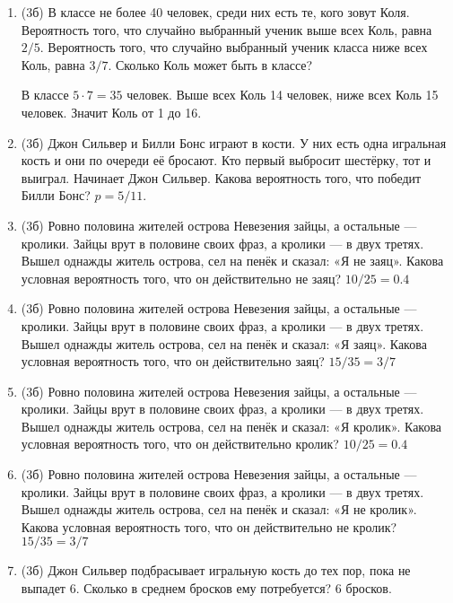 \documentclass[a4paper, 12pt]{article}
\begin{document}
\newpage
\begin{enumerate}[resume]
\item (3б) В классе не более 40 человек, среди них есть те, кого зовут Коля. Вероятность того, что случайно выбранный ученик выше всех Коль, равна $2/5$. Вероятность того, что случайно выбранный ученик класса ниже всех Коль, равна $3/7$. Сколько Коль может быть в классе?

В классе $5\cdot 7=35$ человек. Выше всех Коль 14 человек, ниже всех Коль 15 человек. Значит Коль от 1 до 16.
\item (3б) Джон Сильвер и Билли Бонс играют в кости. У них есть одна игральная кость и они по очереди её бросают. Кто первый выбросит шестёрку, тот и выиграл. Начинает Джон Сильвер. Какова вероятность того, что победит Билли Бонс? $p=5/11$.
\item (3б) Ровно половина жителей острова Невезения зайцы, а остальные — кролики. Зайцы врут в половине своих фраз, а кролики — в двух третях. Вышел однажды житель острова, сел на пенёк и сказал: «Я не заяц». Какова условная вероятность того, что он действительно не заяц? $10/25=0.4$
\item (3б) Ровно половина жителей острова Невезения зайцы, а остальные — кролики. Зайцы врут в половине своих фраз, а кролики — в двух третях. Вышел однажды житель острова, сел на пенёк и сказал: «Я заяц». Какова условная вероятность того, что он действительно заяц? $15/35=3/7$
\item (3б) Ровно половина жителей острова Невезения зайцы, а остальные — кролики. Зайцы врут в половине своих фраз, а кролики — в двух третях. Вышел однажды житель острова, сел на пенёк и сказал: «Я кролик». Какова условная вероятность того, что он действительно кролик? $10/25=0.4$
\item (3б) Ровно половина жителей острова Невезения зайцы, а остальные — кролики. Зайцы врут в половине своих фраз, а кролики — в двух третях. Вышел однажды житель острова, сел на пенёк и сказал: «Я не кролик». Какова условная вероятность того, что он действительно не кролик? $15/35=3/7$
\item (3б) Джон Сильвер подбрасывает игральную кость до тех пор, пока не выпадет 6. Сколько в среднем бросков ему потребуется? $6$ бросков.

\end{enumerate}
\end{document}
